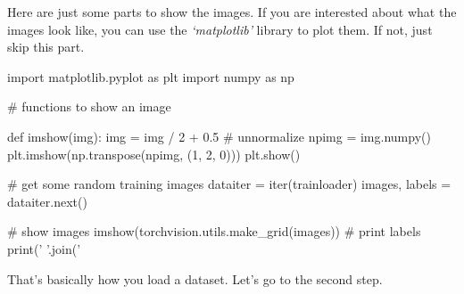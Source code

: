Here are just some parts to show the images. If you are interested about what the images look like, you can use the \emph{`matplotlib'} library to plot them. If not, just skip this part.
\begin{python}
import matplotlib.pyplot as plt
import numpy as np

# functions to show an image

def imshow(img):
    img = img / 2 + 0.5     # unnormalize
    npimg = img.numpy()
    plt.imshow(np.transpose(npimg, (1, 2, 0)))
    plt.show()

# get some random training images
dataiter = iter(trainloader)
images, labels = dataiter.next()

# show images
imshow(torchvision.utils.make_grid(images))
# print labels
print(' '.join('%
\end{python}

That's basically how you load a dataset. Let's go to the second step.
